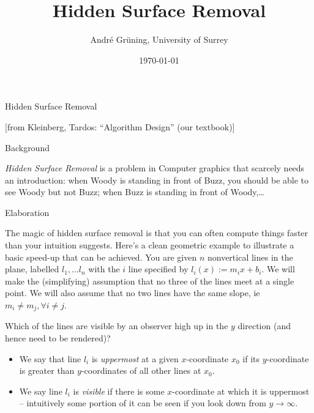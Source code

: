 \documentclass[ignorenonframetext,]{beamer}
\title{Hidden Surface Removal}
\author{André Grüning, University of Surrey}
\date{\today}
\providecommand{\tightlist}{%
  \setlength{\itemsep}{0pt}\setlength{\parskip}{0pt}}
\begin{document}
\frame{\titlepage}

\begin{frame}{Hidden Surface Removal}

{[}from Kleinberg, Tardos: ``Algorithm Design'' (our textbook){]}

\begin{block}{Background}

\emph{Hidden Surface Removal} is a problem in Computer graphics that
scarcely needs an introduction: when Woody is standing in front of Buzz,
you should be able to see Woody but not Buzz; when Buzz is standing in
front of Woody,\dots 

\end{block}

\end{frame}

\begin{frame}

\begin{block}{Elaboration}

The magic of hidden surface removal is that you can often compute things
faster than your intuition suggests. Here's a clean geometric example to
illustrate a basic speed-up that can be achieved. You are given \(n\)
nonvertical lines in the plane, labelled \(l_1, \dots l_n\) with the
\(i\) line specified by \(l_i(x) := m_ix + b_i\). We will make the
(simplifying) assumption that no three of the lines meet at a single
point. We will also assume that no two lines have the same slope, ie $m_i \neq m_j, \forall i\neq j$.

Which of the lines are visible by an observer high up in the \(y\)
direction (and hence need to be rendered)?

\begin{itemize}[<+->]
\tightlist
\item
  We say that line \(l_i\) is \emph{uppermost} at a given
  \(x\)-coordinate \(x_0\) if its \(y\)-coordinate is greater than
  \(y\)-coordinates of all other lines at \(x_0\).
\item
  We say line \(l_i\) is \emph{visible} if there is some
  \(x\)-coordinate at which it is uppermost -- intuitively some portion
  of it can be seen if you look down from \(y \to \infty\).
\end{itemize}

\end{block}

\end{frame}
\end{document}
